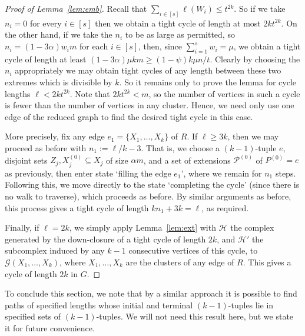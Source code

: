 \documentclass[12pt,a4paper]{amsart}
\newcommand{\cG}{\mathcal{G}}
\newcommand{\paths}{\mathscr{P}}
\begin{document}
\begin{proof}[Proof of Lemma~\ref{lem:emb}]
Recall that $\sum_{i \in [s]} \ell(W_i) \leq t^{2k}$. So if we take $n_i = 0$
for every $i \in [s]$ then we obtain a tight cycle of length at most $2k
t^{2k}$. On the other hand, if we take the $n_i$ to be as large as permitted,
so $n_i = (1-3\alpha)w_i m$ for each $i \in [s]$, then, since $\sum_{i=1}^{s} w_i = \mu$, we obtain a tight cycle of length at least $(1-3\alpha) \mu k m \geq
(1-\psi) k \mu n/t$. Clearly by choosing the $n_i$ appropriately we may
obtain tight cycles of any length between these two extremes which is divisible
by $k$. So it remains only to prove the lemma for cycle lengths $\ell < 2k
t^{2k}$. Note that $2k t^{2k} < m$, so the number of vertices in such a
cycle is fewer than the number of vertices in any cluster. Hence, we need only use
one edge of the reduced graph to find the desired tight cycle in this case.

More precisely, fix any edge $e_1 = \{X_1, \dots, X_k\}$ of $R$. If $\ell \geq 3k$, then we may
proceed as before with $n_1 := \ell/k - 3$. That is, we choose a $(k-1)$-tuple
$e$, disjoint sets $Z_j, X^{(0)}_j \subseteq X_j$ of size $\alpha m$, and a set of extensions $\paths^{(0)}$ of $P^{(0)} = e$ as previously, then enter state `filling the edge $e_1$', where we remain
for $n_1$ steps. Following this, we move directly to the state `completing the
cycle' (since there is no walk to traverse), which proceeds as before. By
similar arguments as before, this process gives a tight cycle of length
$kn_1 + 3k = \ell$, as required.

Finally, if $\ell = 2k$, we simply apply Lemma~\ref{lem:ext}
 with $\mathcal{H}$ the complex generated by the down-closure of a tight cycle of length $2k$, and
 $\mathcal{H}'$ the subcomplex induced by any $k-1$ consecutive vertices of this cycle, to 
 $\cG(X_1, \dots, X_k)$, where $X_1, \dots, X_k$ are the clusters of any edge of $R$. 
 This gives a cycle of length $2k$ in $G$.
\end{proof}

To conclude this section, we note that by a similar approach it is possible to find paths of specified
lengths whose initial and terminal $(k-1)$-tuples lie in specified sets of $(k-1)$-tuples. We will not need this
result here, but we state it for future convenience. 
\end{document}
